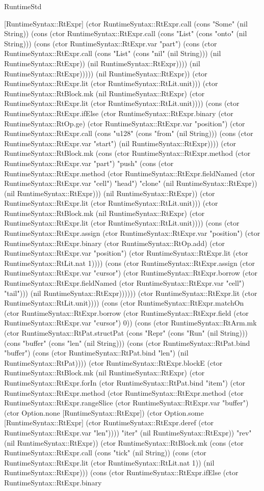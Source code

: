 \begin{lexlean}{RuntimeStd}
\begin{semanticmodule}
{[RuntimeSyntax::RtExpr] (ctor RuntimeSyntax::RtExpr.call (cons "Some" (nil String)) (cons (ctor RuntimeSyntax::RtExpr.call (cons "List" (cons "onto" (nil String))) (cons (ctor RuntimeSyntax::RtExpr.var "part") (cons (ctor RuntimeSyntax::RtExpr.call (cons "List" (cons "nil" (nil String))) (nil RuntimeSyntax::RtExpr)) (nil RuntimeSyntax::RtExpr)))) (nil RuntimeSyntax::RtExpr))))) (nil RuntimeSyntax::RtExpr)) (ctor RuntimeSyntax::RtExpr.lit (ctor RuntimeSyntax::RtLit.unit))) (ctor RuntimeSyntax::RtBlock.mk (nil RuntimeSyntax::RtExpr) (ctor RuntimeSyntax::RtExpr.lit (ctor RuntimeSyntax::RtLit.unit)))) (cons (ctor RuntimeSyntax::RtExpr.ifElse (ctor RuntimeSyntax::RtExpr.binary (ctor RuntimeSyntax::RtOp.ge) (ctor RuntimeSyntax::RtExpr.var "position") (ctor RuntimeSyntax::RtExpr.call (cons "u128" (cons "from" (nil String))) (cons (ctor RuntimeSyntax::RtExpr.var "start") (nil RuntimeSyntax::RtExpr)))) (ctor RuntimeSyntax::RtBlock.mk (cons (ctor RuntimeSyntax::RtExpr.method (ctor RuntimeSyntax::RtExpr.var "part") "push" (cons (ctor RuntimeSyntax::RtExpr.method (ctor RuntimeSyntax::RtExpr.fieldNamed (ctor RuntimeSyntax::RtExpr.var "cell") "head") "clone" (nil RuntimeSyntax::RtExpr)) (nil RuntimeSyntax::RtExpr))) (nil RuntimeSyntax::RtExpr)) (ctor RuntimeSyntax::RtExpr.lit (ctor RuntimeSyntax::RtLit.unit))) (ctor RuntimeSyntax::RtBlock.mk (nil RuntimeSyntax::RtExpr) (ctor RuntimeSyntax::RtExpr.lit (ctor RuntimeSyntax::RtLit.unit)))) (cons (ctor RuntimeSyntax::RtExpr.assign (ctor RuntimeSyntax::RtExpr.var "position") (ctor RuntimeSyntax::RtExpr.binary (ctor RuntimeSyntax::RtOp.add) (ctor RuntimeSyntax::RtExpr.var "position") (ctor RuntimeSyntax::RtExpr.lit (ctor RuntimeSyntax::RtLit.nat 1)))) (cons (ctor RuntimeSyntax::RtExpr.assign (ctor RuntimeSyntax::RtExpr.var "cursor") (ctor RuntimeSyntax::RtExpr.borrow (ctor RuntimeSyntax::RtExpr.fieldNamed (ctor RuntimeSyntax::RtExpr.var "cell") "tail"))) (nil RuntimeSyntax::RtExpr)))))) (ctor RuntimeSyntax::RtExpr.lit (ctor RuntimeSyntax::RtLit.unit)))) (cons (ctor RuntimeSyntax::RtExpr.matchOn (ctor RuntimeSyntax::RtExpr.borrow (ctor RuntimeSyntax::RtExpr.field (ctor RuntimeSyntax::RtExpr.var "cursor") 0)) (cons (ctor RuntimeSyntax::RtArm.mk (ctor RuntimeSyntax::RtPat.structPat (cons "Repr" (cons "Run" (nil String))) (cons "buffer" (cons "len" (nil String))) (cons (ctor RuntimeSyntax::RtPat.bind "buffer") (cons (ctor RuntimeSyntax::RtPat.bind "len") (nil RuntimeSyntax::RtPat)))) (ctor RuntimeSyntax::RtExpr.blockE (ctor RuntimeSyntax::RtBlock.mk (nil RuntimeSyntax::RtExpr) (ctor RuntimeSyntax::RtExpr.forIn (ctor RuntimeSyntax::RtPat.bind "item") (ctor RuntimeSyntax::RtExpr.method (ctor RuntimeSyntax::RtExpr.method (ctor RuntimeSyntax::RtExpr.rangeSlice (ctor RuntimeSyntax::RtExpr.var "buffer") (ctor Option.none [RuntimeSyntax::RtExpr]) (ctor Option.some [RuntimeSyntax::RtExpr] (ctor RuntimeSyntax::RtExpr.deref (ctor RuntimeSyntax::RtExpr.var "len")))) "iter" (nil RuntimeSyntax::RtExpr)) "rev" (nil RuntimeSyntax::RtExpr)) (ctor RuntimeSyntax::RtBlock.mk (cons (ctor RuntimeSyntax::RtExpr.call (cons "tick" (nil String)) (cons (ctor RuntimeSyntax::RtExpr.lit (ctor RuntimeSyntax::RtLit.nat 1)) (nil RuntimeSyntax::RtExpr))) (cons (ctor RuntimeSyntax::RtExpr.ifElse (ctor RuntimeSyntax::RtExpr.binary }
\end{semanticmodule}
\end{lexlean}
